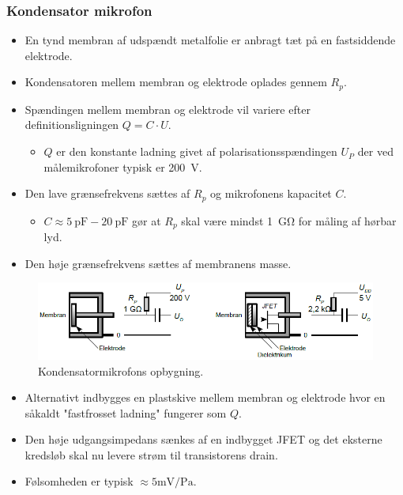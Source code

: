 \subsubsection{Kondensator mikrofon}
\begin{itemize}
	\item En tynd membran af udspændt metalfolie er anbragt tæt på
	en fastsiddende elektrode.
	\item Kondensatoren mellem membran og elektrode oplades gennem $R_p$. 
	\item Spændingen mellem membran og elektrode vil variere efter definitionsligningen $Q = C\cdot U$.
	\begin{itemize}
		\item $Q$ er den konstante ladning givet af polarisationsspændingen $U_P$ der ved målemikrofoner typisk er \SI{200}{\volt}.
	\end{itemize}
	\item Den lave grænsefrekvens sættes af $R_p$ og mikrofonens kapacitet $C$.
	\begin{itemize}
		\item $C \approx \SI{5}{\pico\farad}-\SI{20}{\pico\farad}$ gør at  $R_p$ skal være mindst \SI{1}{\giga\ohm} for måling af hørbar lyd.
	\end{itemize}
	\item Den høje grænsefrekvens sættes af membranens masse. 
\end{itemize}

\begin{figure} [H]
	\centering
	\includegraphics[width=\linewidth]{graphics/11.png}
	\caption{Kondensatormikrofons opbygning.}
	\label{fig:11}
\end{figure}

\begin{itemize}
	\item Alternativt indbygges en plastskive mellem membran og elektrode hvor en såkaldt "fastfrosset ladning" fungerer som $Q$.
	\item Den høje udgangsimpedans sænkes af en indbygget JFET og det eksterne kredsløb skal nu levere strøm til transistorens drain.
	\item Følsomheden er typisk $\approx 5 \si{\milli\volt}/\si{\pascal}$. 
\end{itemize}

